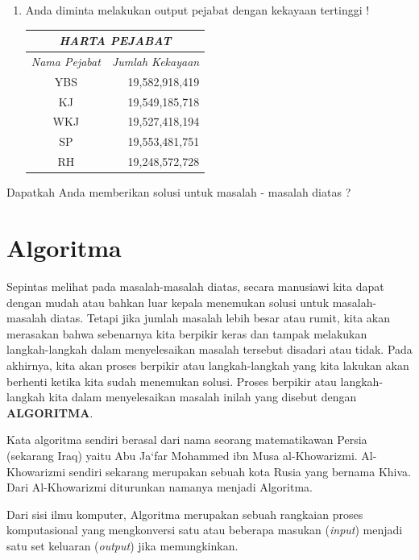 \begin{enumerate}
	\item Anda diminta melakukan output pejabat dengan kekayaan tertinggi !
			\begin{center}
				\begin{tabular}[h!]{| c | r |}
				\hline
				\multicolumn{2}{|c|}{\textit{HARTA PEJABAT}} \\
				\hline	
				\textit{Nama Pejabat } & \textit{Jumlah Kekayaan} \\ \hline
				YBS & 19,582,918,419 \\ \hline
				KJ & 19,549,185,718 \\ \hline
				WKJ & 19,527,418,194 \\ \hline
				SP & 19,553,481,751 \\ \hline
				RH & 19,248,572,728 \\ 
				\hline
				\end{tabular}
		\end{center}
		
\end{enumerate}

Dapatkah Anda memberikan solusi untuk masalah - masalah diatas ?  

\section{Algoritma}	
Sepintas melihat pada masalah-masalah diatas, secara manusiawi kita dapat dengan mudah atau bahkan luar kepala menemukan solusi untuk masalah-masalah diatas.  Tetapi jika jumlah masalah lebih besar atau rumit, kita akan merasakan bahwa sebenarnya kita berpikir keras dan tampak melakukan langkah-langkah dalam menyelesaikan masalah tersebut disadari atau tidak. Pada akhirnya, kita akan  proses berpikir atau langkah-langkah yang kita lakukan akan berhenti ketika kita sudah menemukan solusi. Proses berpikir atau langkah-langkah kita dalam menyelesaikan masalah inilah yang disebut dengan \textbf{ALGORITMA}. 

Kata algoritma sendiri berasal dari nama seorang matematikawan Persia (sekarang Iraq) yaitu Abu Ja`far Mohammed ibn Musa al-Khowarizmi. Al-Khowarizmi sendiri sekarang merupakan sebuah kota Rusia yang bernama Khiva. Dari Al-Khowarizmi diturunkan namanya menjadi Algoritma. 

Dari sisi ilmu komputer, Algoritma merupakan sebuah rangkaian proses komputasional yang mengkonversi satu atau beberapa masukan (\textit{input}) menjadi satu set keluaran (\textit{output}) jika memungkinkan. 

